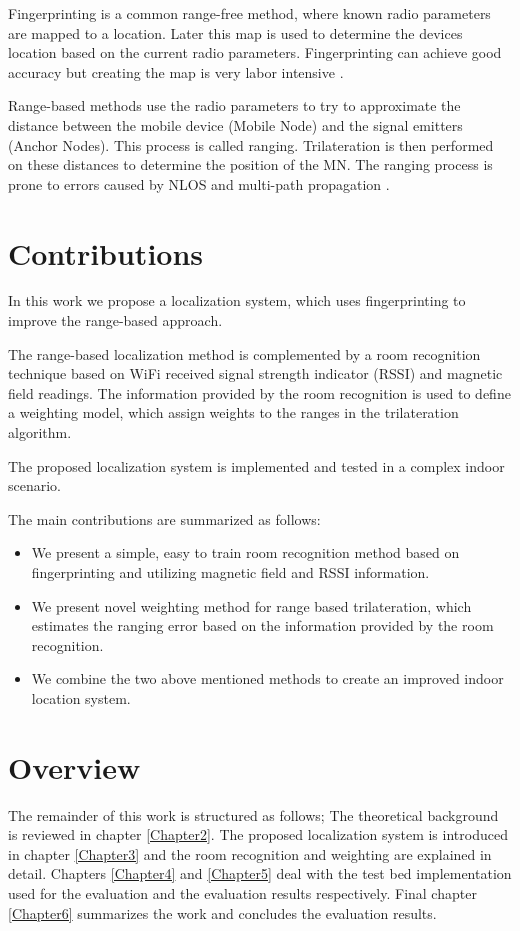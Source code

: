 Fingerprinting is a common range-free method, where known radio parameters are mapped to a location. Later this map is used to determine the devices location based on the current radio parameters. Fingerprinting can achieve good accuracy but creating the map is very labor intensive \cite{FineGrainedIndoorTracking}.

Range-based methods use the radio parameters to try to approximate the distance between the mobile device (Mobile Node) and the signal emitters (Anchor Nodes). This process is called ranging. Trilateration is then performed on these distances to determine the position of the MN. The ranging process is prone to errors caused by NLOS and multi-path propagation \cite{FineGrainedIndoorTracking}.

\section{Contributions}

In this work we propose a localization system, which uses fingerprinting to improve the range-based approach.

The range-based localization method is complemented by a room recognition technique based on WiFi received signal strength indicator (RSSI) and magnetic field readings. The information provided by the room recognition is used to define a weighting model, which assign weights to the ranges in the trilateration algorithm.

The proposed localization system is implemented and tested in a complex indoor scenario.

The main contributions are summarized as follows:
\begin{itemize}
\item We present a simple, easy to train room recognition method based on fingerprinting and utilizing magnetic field and RSSI information.
\item We present novel weighting method for range based trilateration, which estimates the ranging error based on the information provided by the room recognition.
\item We combine the two above mentioned methods to create an improved indoor location system.
\end{itemize}

\section{Overview}

The remainder of this work is structured as follows; The theoretical background is reviewed in chapter \ref{Chapter2}. The proposed localization system is introduced in chapter \ref{Chapter3} and the room recognition and weighting are explained in detail. Chapters \ref{Chapter4} and \ref{Chapter5} deal with the test bed implementation used for the evaluation and the evaluation results respectively. Final chapter \ref{Chapter6} summarizes the work and concludes the evaluation results.

